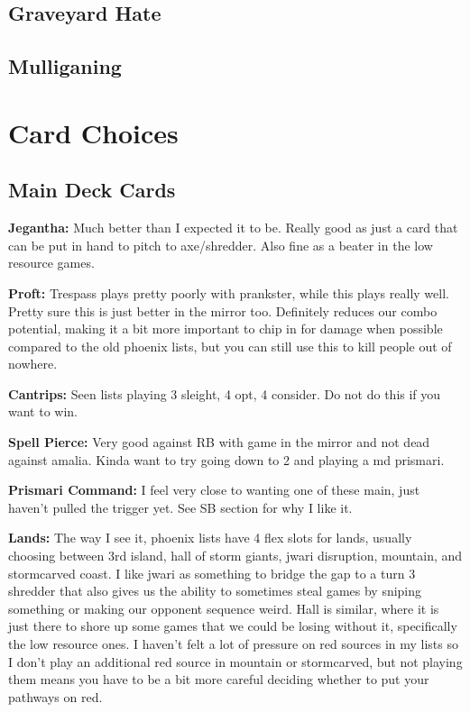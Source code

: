 \documentclass[12pt]{article}
\begin{document}
\subsection{Graveyard Hate}

\subsection{Mulliganing}

\clearpage
\section{Card Choices}
\subsection{Main Deck Cards}
\label{sec:mainchoices}
\textbf{Jegantha:}
Much better than I expected it to be. Really good as just a card that can be put in hand to pitch to axe/shredder. Also fine as a beater in the low resource games.

\vspace{0.4em}
\noindent \textbf{Proft:}
Trespass plays pretty poorly with prankster, while this plays really well. Pretty sure this is just better in the mirror too. Definitely reduces our combo potential, making it a bit more important to chip in for damage when possible compared to the old phoenix lists, but you can still use this to kill people out of nowhere.

\vspace{0.4em}
\noindent \textbf{Cantrips:}
Seen lists playing 3 sleight, 4 opt, 4 consider. Do not do this if you want to win.

\vspace{0.4em}
\noindent \textbf{Spell Pierce:}
Very good against RB with game in the mirror and not dead against amalia. Kinda want to try going down to 2 and playing a md prismari.

\vspace{0.4em}
\noindent \textbf{Prismari Command:}
I feel very close to wanting one of these main, just haven't pulled the trigger yet. See SB section for why I like it.

\vspace{0.4em}
\noindent \textbf{Lands:}
The way I see it, phoenix lists have 4 flex slots for lands, usually choosing between 3rd island, hall of storm giants, jwari disruption, mountain, and stormcarved coast. I like jwari as something to bridge the gap to a turn 3 shredder that also gives us the ability to sometimes steal games by sniping something or making our opponent sequence weird. Hall is similar, where it is just there to shore up some games that we could be losing without it, specifically the low resource ones. I haven't felt a lot of pressure on red sources in my lists so I don't play an additional red source in mountain or stormcarved, but not playing them means you have to be a bit more careful deciding whether to put your pathways on red.
\end{document}
